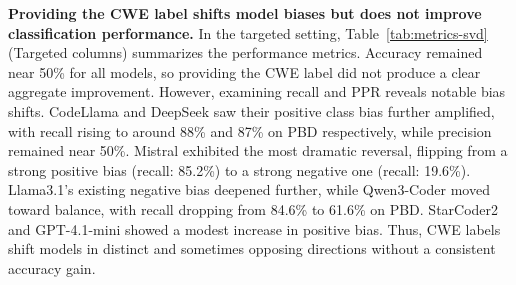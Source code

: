 \documentclass[lettersize,journal]{IEEEtran}
\begin{document}
\textbf{Providing the CWE label shifts model biases but does not improve classification performance.}
In the targeted setting, Table~\ref{tab:metrics-svd} (Targeted columns) summarizes the performance metrics. Accuracy remained near 50\% for all models, so providing the CWE label did not produce a clear aggregate improvement. However, examining recall and \gls{PPR} reveals notable bias shifts. CodeLlama and DeepSeek saw their positive class bias further amplified, with recall rising to around 88\% and 87\% on PBD respectively, while precision remained near 50\%. Mistral exhibited the most dramatic reversal, flipping from a strong positive bias (recall: 85.2\%) to a strong negative one (recall: 19.6\%). Llama3.1's existing negative bias deepened further, while Qwen3-Coder moved toward balance, with recall dropping from 84.6\% to 61.6\% on PBD. StarCoder2 and GPT-4.1-mini showed a modest increase in positive bias. Thus, CWE labels shift models in distinct and sometimes opposing directions without a consistent accuracy gain.
\end{document}
